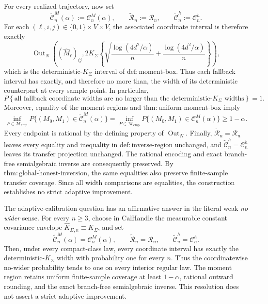 For every realized trajectory, now set
\[
 \widetilde{\mathcal C}_n^M(\alpha):=\mathcal C_n^M(\alpha),
 \qquad
 \widetilde{\mathcal R}_n:=\mathcal R_n,
 \qquad
 \widetilde{\mathcal C}_n^h:=\mathcal C_n^h.
\]
For each \((\ell,i,j)\in\{0,1\}\times V\times V\), the associated
coordinate interval is therefore exactly
\[
 \operatorname{Out}_N\!\left((\widehat M_\ell)_{ij},
 2K_\Sigma\left\{
 \sqrt{\frac{\log(4d^2/\alpha)}{n}}
 +\frac{\log(4d^2/\alpha)}{n}\right\}\right),
\]
which is the deterministic-\(K_\Sigma\) interval of
\(\mathrm{def{:}moment\mbox{-}box}\).  Thus each fallback interval has
exactly, and therefore no more than, the width of its deterministic
counterpart at every sample point.  In particular,
\[
 P\!\left\{\text{all fallback coordinate widths are no larger than the
 deterministic-\(K_\Sigma\) widths}\right\}=1.
\]
Moreover, equality of the moment regions and
\(\mathrm{thm{:}uniform\mbox{-}moment\mbox{-}box}\) imply
\[
 \inf_{P\in\mathcal M_{\mathrm{cmp}}}
 P\{(M_0,M_1)\in\widetilde{\mathcal C}_n^M(\alpha)\}
 =
 \inf_{P\in\mathcal M_{\mathrm{cmp}}}
 P\{(M_0,M_1)\in\mathcal C_n^M(\alpha)\}
 \geq1-\alpha.
\]
Every endpoint is rational by the defining property of
\(\operatorname{Out}_N\).  Finally,
\(\widetilde{\mathcal R}_n=\mathcal R_n\) leaves every equality and
inequality in \(\mathrm{def{:}inverse\mbox{-}region}\) unchanged, and
\(\widetilde{\mathcal C}_n^h=\mathcal C_n^h\) leaves its transfer
projection unchanged.  The rational encoding and exact branch-free
semialgebraic inverse are consequently preserved.  By
\(\mathrm{thm{:}global\mbox{-}honest\mbox{-}inversion}\), the same
equalities also preserve finite-sample transfer coverage.  Since all width
comparisons are equalities, the construction establishes no strict adaptive
improvement.

The adaptive-calibration question has an affirmative answer in the literal
weak \emph{no wider} sense.  For every \(n\geq3\), choose in
\(\mathrm{CalHandle}\) the measurable constant covariance envelope
\(\widehat K_{\Sigma,n}\equiv K_\Sigma\), and set
\[
 \widetilde{\mathcal C}_n^M(\alpha)=\mathcal C_n^M(\alpha),
 \qquad
 \widetilde{\mathcal R}_n=\mathcal R_n,
 \qquad
 \widetilde{\mathcal C}_n^h=\mathcal C_n^h.
\]
Then, under every compact-class law, every coordinate interval has exactly
the deterministic-\(K_\Sigma\) width with probability one for every
\(n\).  Thus the coordinatewise no-wider probability tends to one on every
interior regular law.  The moment region retains uniform finite-sample
coverage at least \(1-\alpha\), rational outward rounding, and the exact
branch-free semialgebraic inverse.  This resolution does not assert a
strict adaptive improvement.

